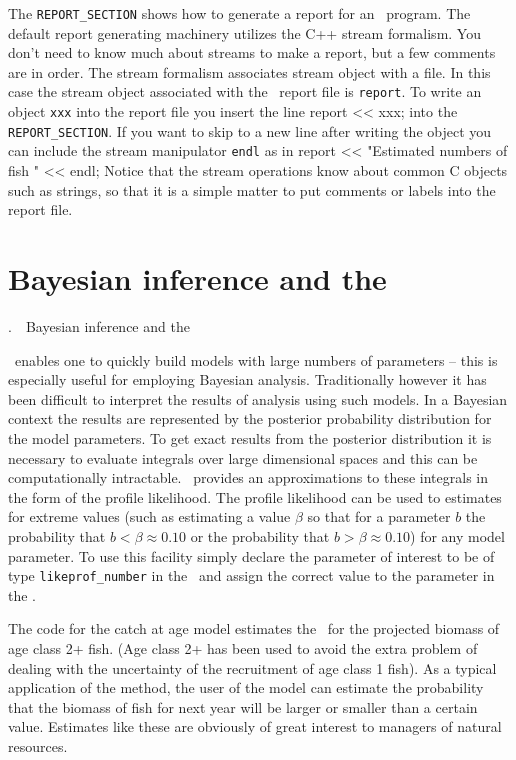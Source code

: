 \documentclass[12pt]{book}
\makeatletter
\def\mysection#1{\section{#1}{\bigbf \medbreak\noindent\number\c@chapter.\number\c@section\ \ #1\medbreak}}
\makeatother
\begin{document}
The {\tt REPORT\_SECTION} shows how to generate a report
for an \ADM\ program.  The default report generating machinery
utilizes the C++ stream formalism. You don't need to know much
about streams to make a report, but a few comments are in order. 
The stream formalism associates stream object with
a file. In this case the stream object associated with
the \ADM\ report file is {\tt report}. To write an object
{\tt xxx} into the report  file you insert the line 
\beginexample
  report << xxx;
\endexample
\noindent into the {\tt REPORT\_SECTION}.
If you want to skip to a new line after writing the object you can 
include the stream manipulator {\tt endl} as in 
\beginexample
  report << "Estimated numbers of fish " << endl;
\endexample
\noindent Notice that the stream operations know about
common C objects such as strings, so that it is a simple matter
to put comments or labels into the report file.
\mysection{Bayesian inference and the \apl}

\ADM\ enables one to quickly build models with large numbers of
parameters -- this is especially useful for employing
Bayesian analysis. Traditionally however it has been difficult to
interpret the results of analysis using such models.
In a Bayesian context the results are represented
by the posterior probability distribution for the
model parameters. To get exact results from
the posterior distribution it is necessary to evaluate
integrals over large dimensional spaces and this can be computationally
intractable.  \ADM\ provides an 
approximations to these
integrals in the form of the profile likelihood. The
profile likelihood can be used to 
estimates for extreme values 
(such as estimating a value $\beta$ so that for a 
parameter $b$ the probability that $b<\beta \approx 0.10$
or the probability that $b>\beta \approx 0.10$) for
any model parameter.
To use this facility simply declare the parameter of interest
to be of type {\tt likeprof\_number} in the \PS\ and assign
the correct value to the parameter in the \PROS.

The code for the catch at age model estimates
the \apl\ for the projected biomass
of age class 2+ fish. (Age class 2+ has been used to avoid the
extra problem of dealing with the uncertainty of the
recruitment of age class 1 fish). As a typical application
of the method, the user of the model can
estimate the probability that the biomass 
of fish for next year will be larger or smaller than a certain
value. Estimates like these are
obviously of great interest to managers of natural resources.  
\end{document}
